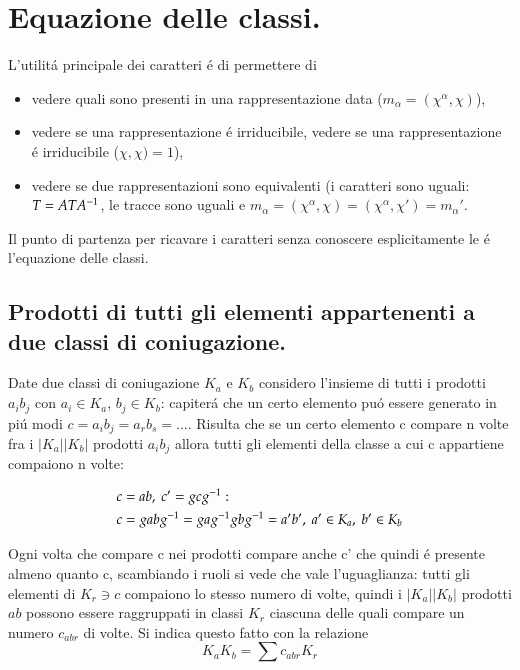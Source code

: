 \documentclass[oneside,12pt]{memoir}
\begin{document}


\section{Equazione delle classi.}

L'utilit\'a principale dei caratteri \'e di permettere di
\begin{itemize}
\item vedere quali \RIs{} sono presenti in una rappresentazione data ($m_{\alpha}=(\chi^{\alpha},\chi)$),
\item vedere se una rappresentazione \'e irriducibile, vedere se una rappresentazione \'e irriducibile ($\chi,\chi)=1$),
\item vedere se due rappresentazioni sono equivalenti (i caratteri sono uguali: $T=AT{{A}^{-1}}$, le tracce sono uguali e $m_{\alpha}=(\chi^{\alpha},\chi)=(\chi^{\alpha},\chi')=m_{\alpha}'$.
\end{itemize}

Il punto di partenza per ricavare i caratteri senza conoscere esplicitamente le \RIs{} \'e l'equazione delle classi.

\subsection{Prodotti di tutti gli elementi appartenenti a due classi di coniugazione.}

Date due classi di coniugazione $K_a$ e $K_b$ considero l'insieme di tutti i prodotti $a_ib_j$ con $a_i\in K_a$, $b_j\in K_b$: capiter\'a che un certo elemento pu\'o essere generato in pi\'u modi $c=a_ib_j=a_rb_s=\ldots$. Risulta che se un certo elemento c compare n volte fra i $|K_a||K_b|$ prodotti $a_ib_j$ allora tutti gli elementi della classe a cui c appartiene compaiono n volte:

\begin{align*}
&c=ab,\ c'=gc{{g}^{-1}}:\\
&c=gab{{g}^{-1}}=ga{{g}^{-1}}gb{{g}^{-1}}=a'b',\ a'\in K_a,\ b'\in K_b
\end{align*}

Ogni volta che compare c nei prodotti compare anche c' che quindi \'e presente almeno quanto c, scambiando i ruoli si vede che vale l'uguaglianza: tutti gli elementi di $K_r\ni c$ compaiono lo stesso numero di volte, quindi i $|K_a||K_b|$ prodotti $ab$ possono essere raggruppati in classi $K_r$ ciascuna delle quali compare un numero $c_{abr}$ di volte. Si indica questo fatto con la relazione
\begin{equation}
K_aK_b=\sum c_{abr}K_r\label{eq:classeq}
\end{equation}
\end{document}
